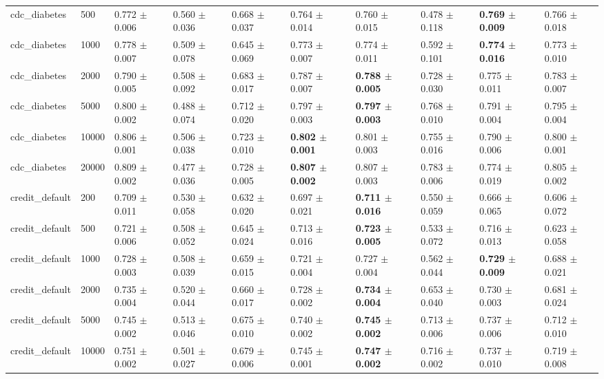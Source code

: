 \begin{table}
\begin{tabular}{llllllllll}
cdc\_diabetes & 500 & 0.772 $\pm$ 0.006 & 0.560 $\pm$ 0.036 & 0.668 $\pm$ 0.037 & 0.764 $\pm$ 0.014 & 0.760 $\pm$ 0.015 & 0.478 $\pm$ 0.118 & \textbf{0.769 $\pm$ 0.009} & 0.766 $\pm$ 0.018 \\
cdc\_diabetes & 1000 & 0.778 $\pm$ 0.007 & 0.509 $\pm$ 0.078 & 0.645 $\pm$ 0.069 & 0.773 $\pm$ 0.007 & 0.774 $\pm$ 0.011 & 0.592 $\pm$ 0.101 & \textbf{0.774 $\pm$ 0.016} & 0.773 $\pm$ 0.010 \\
cdc\_diabetes & 2000 & 0.790 $\pm$ 0.005 & 0.508 $\pm$ 0.092 & 0.683 $\pm$ 0.017 & 0.787 $\pm$ 0.007 & \textbf{0.788 $\pm$ 0.005} & 0.728 $\pm$ 0.030 & 0.775 $\pm$ 0.011 & 0.783 $\pm$ 0.007 \\
cdc\_diabetes & 5000 & 0.800 $\pm$ 0.002 & 0.488 $\pm$ 0.074 & 0.712 $\pm$ 0.020 & 0.797 $\pm$ 0.003 & \textbf{0.797 $\pm$ 0.003} & 0.768 $\pm$ 0.010 & 0.791 $\pm$ 0.004 & 0.795 $\pm$ 0.004 \\
cdc\_diabetes & 10000 & 0.806 $\pm$ 0.001 & 0.506 $\pm$ 0.038 & 0.723 $\pm$ 0.010 & \textbf{0.802 $\pm$ 0.001} & 0.801 $\pm$ 0.003 & 0.755 $\pm$ 0.016 & 0.790 $\pm$ 0.006 & 0.800 $\pm$ 0.001 \\
cdc\_diabetes & 20000 & 0.809 $\pm$ 0.002 & 0.477 $\pm$ 0.036 & 0.728 $\pm$ 0.005 & \textbf{0.807 $\pm$ 0.002} & 0.807 $\pm$ 0.003 & 0.783 $\pm$ 0.006 & 0.774 $\pm$ 0.019 & 0.805 $\pm$ 0.002 \\
credit\_default & 200 & 0.709 $\pm$ 0.011 & 0.530 $\pm$ 0.058 & 0.632 $\pm$ 0.020 & 0.697 $\pm$ 0.021 & \textbf{0.711 $\pm$ 0.016} & 0.550 $\pm$ 0.059 & 0.666 $\pm$ 0.065 & 0.606 $\pm$ 0.072 \\
credit\_default & 500 & 0.721 $\pm$ 0.006 & 0.508 $\pm$ 0.052 & 0.645 $\pm$ 0.024 & 0.713 $\pm$ 0.016 & \textbf{0.723 $\pm$ 0.005} & 0.533 $\pm$ 0.072 & 0.716 $\pm$ 0.013 & 0.623 $\pm$ 0.058 \\
credit\_default & 1000 & 0.728 $\pm$ 0.003 & 0.508 $\pm$ 0.039 & 0.659 $\pm$ 0.015 & 0.721 $\pm$ 0.004 & 0.727 $\pm$ 0.004 & 0.562 $\pm$ 0.044 & \textbf{0.729 $\pm$ 0.009} & 0.688 $\pm$ 0.021 \\
credit\_default & 2000 & 0.735 $\pm$ 0.004 & 0.520 $\pm$ 0.044 & 0.660 $\pm$ 0.017 & 0.728 $\pm$ 0.002 & \textbf{0.734 $\pm$ 0.004} & 0.653 $\pm$ 0.040 & 0.730 $\pm$ 0.003 & 0.681 $\pm$ 0.024 \\
credit\_default & 5000 & 0.745 $\pm$ 0.002 & 0.513 $\pm$ 0.046 & 0.675 $\pm$ 0.010 & 0.740 $\pm$ 0.002 & \textbf{0.745 $\pm$ 0.002} & 0.713 $\pm$ 0.006 & 0.737 $\pm$ 0.006 & 0.712 $\pm$ 0.010 \\
credit\_default & 10000 & 0.751 $\pm$ 0.002 & 0.501 $\pm$ 0.027 & 0.679 $\pm$ 0.006 & 0.745 $\pm$ 0.001 & \textbf{0.747 $\pm$ 0.002} & 0.716 $\pm$ 0.002 & 0.737 $\pm$ 0.010 & 0.719 $\pm$ 0.008 \\

\end{tabular}
\end{table}
